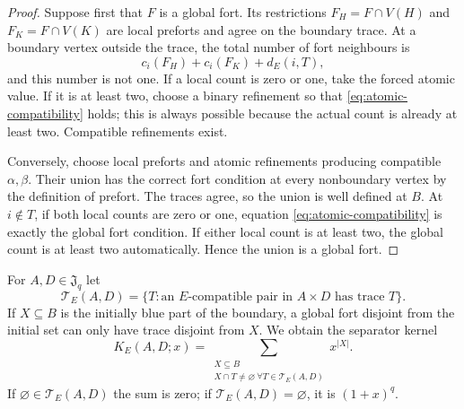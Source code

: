 \documentclass[11pt,reqno]{amsart}
\theoremstyle{definition}
\begin{document}
\begin{proof}
Suppose first that $F$ is a global fort.  Its restrictions
$F_H=F\cap V(H)$ and $F_K=F\cap V(K)$ are local preforts and agree on the
boundary trace.  At a boundary vertex outside the trace, the total number of
fort neighbours is
\[
 c_i(F_H)+c_i(F_K)+d_E(i,T),
\]
and this number is not one.  If a local count is zero or one, take the forced
atomic value.  If it is at least two, choose a binary refinement so that
\eqref{eq:atomic-compatibility} holds; this is always possible because the
actual count is already at least two.  Compatible refinements exist.

Conversely, choose local preforts and atomic refinements producing compatible
$\alpha,\beta$.  Their union has the correct fort condition at every
nonboundary vertex by the definition of prefort.  The traces agree, so the
union is well defined at $B$.  At $i\notin T$, if both local counts are zero or
one, equation \eqref{eq:atomic-compatibility} is exactly the global fort
condition.  If either local count is at least two, the global count is at
least two automatically.  Hence the union is a global fort.
\end{proof}

For $A,D\in\mathfrak J_q$ let
\[
 \mathcal T_E(A,D)
 =\{T:\text{an $E$-compatible pair in $A\times D$ has trace }T\}.
\]
If $X\subseteq B$ is the initially blue part of the boundary, a global fort
disjoint from the initial set can only have trace disjoint from $X$.  We obtain
the separator kernel
\begin{equation}\label{eq:separator-kernel}
 K_E(A,D;x)
 =\sum_{\substack{X\subseteq B\\
      X\cap T\ne\varnothing\ \forall T\in\mathcal T_E(A,D)}}x^{|X|}.
\end{equation}
If $\varnothing\in\mathcal T_E(A,D)$ the sum is zero; if
$\mathcal T_E(A,D)=\varnothing$, it is $(1+x)^q$.
\end{document}
